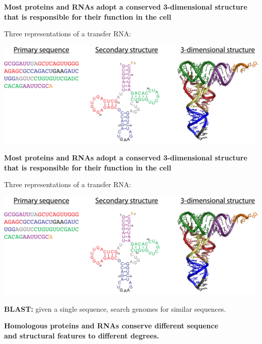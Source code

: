 \documentclass[landscape]{slides}
\begin{document}
\begin{slide}
\begin{center}
{\bf Most proteins and RNAs adopt a conserved 3-dimensional 
  structure that is responsible for their function in the cell}

\medskip

Three representations of a transfer RNA:

\includegraphics[width=9in]{figs/trna-123}

\end{center}

\vfill

\end{slide}
\begin{slide}
\begin{center}
{\bf Most proteins and RNAs adopt a conserved 3-dimensional 
  structure that is responsible for their function in the cell}

\medskip

Three representations of a transfer RNA:

\includegraphics[width=9in]{figs/trna-123}

{\bf BLAST:} given a single sequence, search genomes for similar sequences.


{\bf Homologous proteins and RNAs conserve different sequence \\
and structural features to different degrees.}
\end{center}

\vfill

\end{slide}
\end{document}
